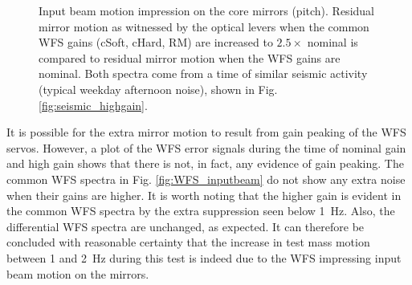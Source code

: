 \begin{figure}
\begin{centering}
\caption[Impression of input beam motion on the core mirrors]{Input
  beam motion impression on the core mirrors (pitch). Residual mirror motion
  as witnessed by the optical levers when the common WFS gains (cSoft,
  cHard, RM) are increased to $2.5\times$ nominal is compared to residual
  mirror motion when the WFS gains are nominal. Both spectra come from
  a time of similar seismic activity (typical weekday afternoon
  noise), shown in Fig. \ref{fig:seismic_highgain}.}
\label{fig:inputbeam_impression}
\end{centering}
\end{figure}

It is possible for the extra mirror motion to result from gain peaking
of the WFS servos. However, a plot of the WFS error signals during the
time of nominal gain and high gain shows that there is not, in fact,
any evidence of gain peaking. The common WFS spectra in
Fig. \ref{fig:WFS_inputbeam} do not show any extra noise when their
gains are higher. It is worth noting that the higher gain is evident
in the common WFS spectra by the extra suppression seen below
1~Hz. Also, the differential WFS spectra are unchanged, as
expected. It can therefore be concluded with reasonable certainty that
the increase in test mass motion between 1 and 2~Hz during this test
is indeed due to the WFS impressing input beam motion on the mirrors.

